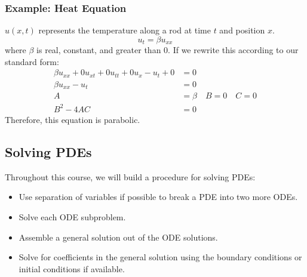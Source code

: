 \documentclass{math}
\begin{document}
\subsubsection*{Example: Heat Equation}
\( u(x,t) \) represents the temperature along a rod at time \( t \) and
position \( x \).
\[ u_t = \beta u_{xx} \]
where \( \beta \) is real, constant, and greater than 0. If we rewrite this
according to our standard form:
\begin{align*}
  \beta u_{xx}+0u_{xt}+0u_{tt}+0u_x-u_t+0 &= 0 \\
  \beta u_{xx}-u_t &= 0 \\
  A &= \beta \quad B = 0 \quad C = 0 \\
  B^2-4AC &= 0
\end{align*}
Therefore, this equation is parabolic.

\subsection*{Solving PDEs}
Throughout this course, we will build a procedure for solving PDEs:
\begin{itemize}
  \item Use separation of variables if possible to break a PDE into two more
    ODEs.
  \item Solve each ODE subproblem.
  \item Assemble a general solution out of the ODE solutions.
  \item Solve for coefficients in the general solution using the boundary
    conditions or initial conditions if available.
\end{itemize}
\end{document}
